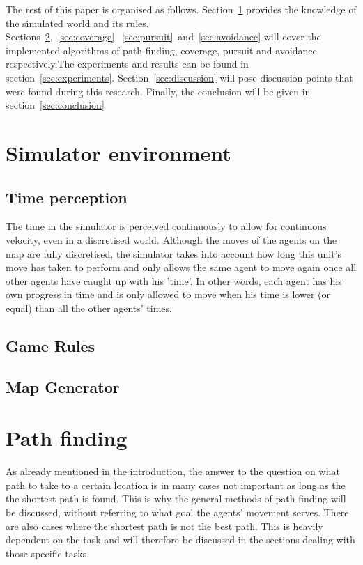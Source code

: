 \documentclass{ba-kecs}
\begin{document}
	
	
	The rest of this paper is organised as follows. Section~\ref{sec:simulator} provides the knowledge of the simulated world and its rules. Sections~\ref{sec:pathfinding},~\ref{sec:coverage},~\ref{sec:pursuit}~and~\ref{sec:avoidance} will cover the implemented algorithms of path finding, coverage, pursuit and avoidance respectively.The experiments and results can be found in section~\ref{sec:experiments}. Section~\ref{sec:discussion} will pose discussion points that were found during this research. Finally, the conclusion will be given in section~\ref{sec:conclusion}
	
		\section{Simulator environment}
		\label{sec:simulator}
		\subsection{Time perception}
			The time in the simulator is perceived continuously to allow for continuous velocity, even in a discretised world. Although the moves of the agents on the map are fully discretised, the simulator takes into account how long this unit's move has taken to perform and only allows the same agent to move again once all other agents have caught up with his 'time'. In other words, each agent has his own progress in time and is only allowed to move when his time is lower (or equal) than all the other agents' times.
		\subsection{Game Rules}
        \subsection{Map Generator}
        


	
\section{Path finding}
\label{sec:pathfinding}
		As already mentioned in the introduction, the answer to the question on what path to take to a certain location is in many cases not important as long as the the shortest path is found. This is why the general methods of path finding will be discussed, without referring to what goal the agents' movement serves. There are also cases where the shortest path is not the best path. This is heavily dependent on the task and will therefore be discussed in the sections dealing with those specific tasks.
\end{document}
